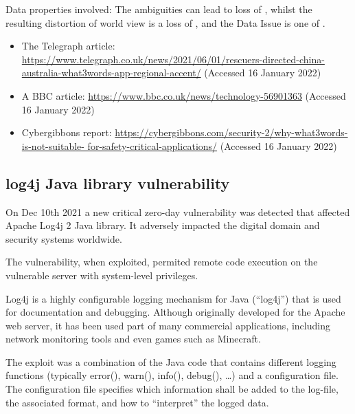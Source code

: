 Data properties involved: The ambiguities can lead to loss of ,
whilst the resulting distortion of world view is a loss of ,
and the Data Issue is one of .

\begin{itemize}
\item The Telegraph article:
  \href{https://www.telegraph.co.uk/news/2021/06/01/rescuers-directed-china-australia-what3words-app-regional-accent/}
       {https://www.telegraph.co.uk/news/2021/06/01/rescuers-directed-china- australia-what3words-app-regional-accent/}
       (Accessed 16 January 2022)
     \item A BBC article: 
       \href{https://www.bbc.co.uk/news/technology-56901363}
            {https://www.bbc.co.uk/news/technology-56901363}
       (Accessed 16 January 2022)
          \item Cybergibbons report:
            \href{https://cybergibbons.com/security-2/why-what3words-is-not-suitable-for-safety-critical-applications/}
                 {https://cybergibbons.com/security-2/why-what3words-is-not-suitable- for-safety-critical-applications/}
       (Accessed 16 January 2022)
\end{itemize}

\subsection{log4j Java library vulnerability} \label{bkm:incacc:log4j}
On Dec 10th 2021 a new critical zero-day vulnerability was detected that affected Apache Log4j 2 Java library. 
It adversely impacted the digital domain and security systems worldwide.

The vulnerability, when exploited, permited remote code execution on the vulnerable server with system-level privileges.

Log4j is a highly configurable logging mechanism for Java (“log4j”) that is used for documentation and debugging.
Although originally developed for the Apache web server, it has been used part of many commercial applications,
including network monitoring tools and even games such as Minecraft.

The exploit was a combination of the Java code that contains different logging functions
(typically error(), warn(), info(), debug(), \dots)
and a configuration file.
The configuration file specifies which information shall be added 
to the log-file, the associated format, and how to ``interpret'' the logged data.

